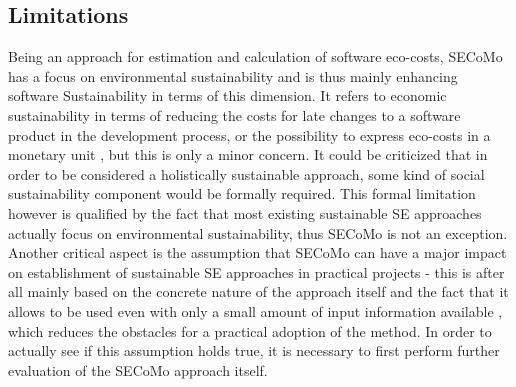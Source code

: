 \documentclass[oribibl]{llncs}
\begin{document}
\subsection{Limitations} %
Being an approach for estimation and calculation of software eco-costs, SECoMo has a focus on environmental sustainability and is thus mainly enhancing software Sustainability in terms of this dimension. It refers to economic sustainability in terms of reducing the costs for late changes to a software product in the development process, or the possibility to express eco-costs in a monetary unit \cite{schulze_cost_2016}, but this is only a minor concern. It could be criticized that in order to be considered a holistically sustainable approach, some kind of social sustainability component would be formally required. %
This formal limitation however is qualified %
by the fact that most existing sustainable SE approaches actually focus on environmental sustainability, thus SECoMo is not an exception.\\
Another critical aspect is the assumption that SECoMo can have a major impact on establishment of sustainable SE approaches in practical projects - this is after all mainly based on the concrete nature of the approach itself and the fact that it allows to be used even with only a small amount of input information available \cite{schulze_cost_2016}, which reduces the obstacles for a practical adoption of the method. In order to actually see if this assumption holds true, it is necessary to first perform further evaluation of the SECoMo approach itself.
\end{document}
